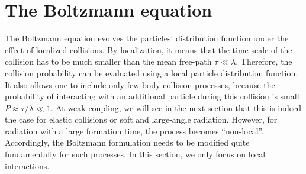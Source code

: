 \section{The Boltzmann equation}
The Boltzmann equation evolves the particles' distribution function under the effect of localized collisions. 
By localization, it means that the time scale of the collision has to be much smaller than the mean free-path $\tau \ll \lambda$. 
Therefore, the collision probability can be evaluated using a local particle distribution function.
It also allows one to include only few-body collision processes, because the probability of interacting with an additional particle during this collision is small $P \approx \tau/\lambda \ll 1$.
At weak coupling, we will see in the next section that this is indeed the case for elastic collisions or soft and large-angle radiation. 
However, for radiation with a large formation time, the process becomes ``non-local''.
Accordingly, the Boltzmann formulation needs to be modified quite fundamentally for such processes.
In this section, we only focus on local interactions.

